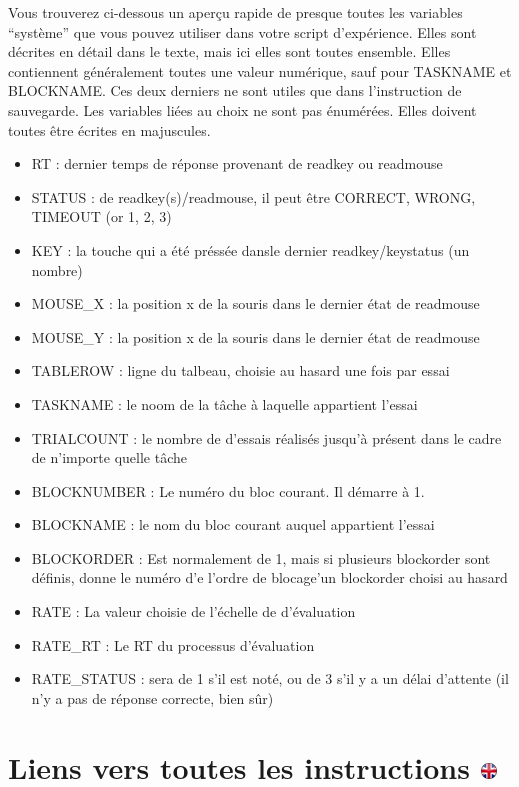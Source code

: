 \documentclass[
]{book}
\providecommand{\tightlist}{%
  \setlength{\itemsep}{0pt}\setlength{\parskip}{0pt}}
\begin{document}
Vous trouverez ci-dessous un aperçu rapide de presque toutes les
variables ``système'' que vous pouvez utiliser dans votre script
d'expérience. Elles sont décrites en détail dans le texte, mais ici
elles sont toutes ensemble. Elles contiennent généralement toutes une
valeur numérique, sauf pour TASKNAME et BLOCKNAME. Ces deux derniers ne
sont utiles que dans l'instruction de sauvegarde. Les variables liées au
choix ne sont pas énumérées. Elles doivent toutes être écrites en
majuscules.

\begin{itemize}
\tightlist
\item
  RT : dernier temps de réponse provenant de readkey ou readmouse
\item
  STATUS : de readkey(s)/readmouse, il peut être CORRECT, WRONG, TIMEOUT
  (or 1, 2, 3)
\item
  KEY : la touche qui a été préssée dansle dernier readkey/keystatus (un
  nombre)
\item
  MOUSE\_X : la position x de la souris dans le dernier état de
  readmouse
\item
  MOUSE\_Y : la position x de la souris dans le dernier état de
  readmouse
\item
  TABLEROW : ligne du talbeau, choisie au hasard une fois par essai
\item
  TASKNAME : le noom de la tâche à laquelle appartient l'essai
\item
  TRIALCOUNT : le nombre de d'essais réalisés jusqu'à présent dans le
  cadre de n'importe quelle tâche
\item
  BLOCKNUMBER : Le numéro du bloc courant. Il démarre à 1.
\item
  BLOCKNAME : le nom du bloc courant auquel appartient l'essai
\item
  BLOCKORDER : Est normalement de 1, mais si plusieurs blockorder sont
  définis, donne le numéro d'e l'ordre de blocage'un blockorder choisi
  au hasard
\item
  RATE : La valeur choisie de l'échelle de d'évaluation
\item
  RATE\_RT : Le RT du processus d'évaluation
\item
  RATE\_STATUS : sera de 1 s'il est noté, ou de 3 s'il y a un délai
  d'attente (il n'y a pas de réponse correcte, bien sûr)
\end{itemize}

\hypertarget{liens-vers-toutes-les-instructions}{%
\section[Liens vers toutes les instructions ]{\texorpdfstring{Liens vers
toutes les instructions
\href{https://www.psytoolkit.org/doc3.2.0/syntax.html\#overview}{\protect\includegraphics{img/ukflag.png}}}{Liens vers toutes les instructions }}\label{liens-vers-toutes-les-instructions}}
\end{document}
